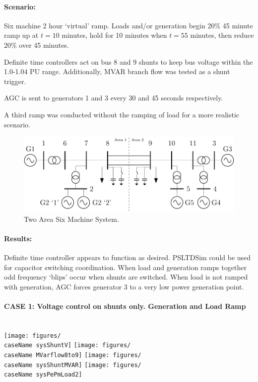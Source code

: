 \documentclass[12pt]{article}
\begin{document}
\paragraph{Scenario: } Six machine 2 hour `virtual' ramp. Loads and/or generation begin  20\% 45 minute ramp up at $t=10$ minutes, hold for 10 minutes when $t=55$ minutes, then reduce 20\% over 45 minutes.

\vspace{1em}
Definite time controllers act on bus 8 and 9 shunts to keep bus voltage within the 1.0-1.04 PU range.
Additionally, MVAR branch flow was tested as a shunt trigger.

AGC is sent to generators 1 and 3 every 30 and 45 seconds respectively.

\vspace{1em}
A third ramp was conducted without the ramping of load for a more realistic scenario.


\begin{figure}[!ht]
	\centering
	\footnotesize
	\includegraphics[width=\linewidth]{../../../TEX/models/sixMachine/sixMachine}
	\caption{Two Area Six Machine System.}
	\label{fig: six machine}
\end{figure}

\paragraph{Results:} 
Definite time controller appears to function as desired.
PSLTDSim could be used for capacitor switching coordination.
When load and generation ramps together odd frequency `blips' occur when shunts are switched.
When load is not ramped with generation, AGC forces generator 3 to a very low power generation point.


\newcommand{\caseName}{def}
\newcommand{\scrunch}{\vspace{-.8em}}
\pagebreak
\paragraph{CASE 1: Voltage control on shunts only. Generation and Load Ramp} \ \\
\renewcommand{\caseName}{sixMachineWindramp1}
\scrunch
\texttt{[image: figures/\\caseName sysShuntV]}
\scrunch
\texttt{[image: figures/\\caseName MVarflow8to9]}
\scrunch
\texttt{[image: figures/\\caseName sysShuntMVAR]}
\scrunch
\texttt{[image: figures/\\caseName sysPePmLoad2]}
\end{document}
